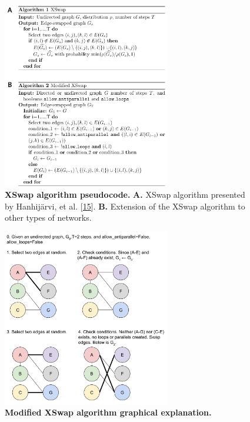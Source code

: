 \begin{figure}
\hypertarget{fig:algo}{%
\centering
\includegraphics[width=0.65\textwidth,height=\textheight]{images/algorithms_label.png}
\caption{\textbf{XSwap algorithm pseudocode.}
\textbf{A.} XSwap algorithm presented by Hanhijärvi, et al. {[}\protect\hyperlink{ref-iKOIEzQ9}{15}{]}.
\textbf{B.} Extension of the XSwap algorithm to other types of networks.}\label{fig:algo}
}
\end{figure}

\begin{figure}
\hypertarget{fig:algodiagram}{%
\centering
\includegraphics[width=0.65\textwidth,height=\textheight]{images/XSwap.svg}
\caption{\textbf{Modified XSwap algorithm graphical explanation.}}\label{fig:algodiagram}
}
\end{figure}


